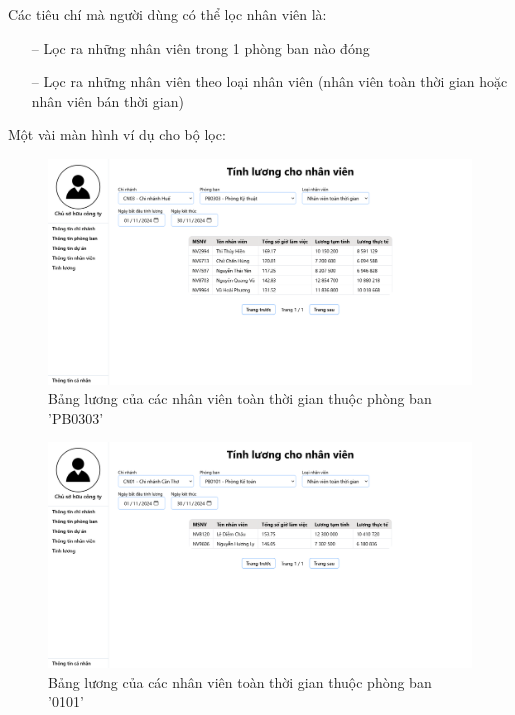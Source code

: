 Các tiêu chí mà người dùng có thể lọc nhân viên là:
\begin{itemize}
    \item [--] Lọc ra những nhân viên trong 1 phòng ban nào đóng
    \item [--] Lọc ra những nhân viên theo loại nhân viên (nhân viên toàn thời gian hoặc nhân viên bán thời gian)
\end{itemize}

Một vài màn hình ví dụ cho bộ lọc:
\begin{figure}[H]
    \centering
    \includegraphics[width=1\linewidth]{content/images/ManHinh_3_c.png}
    \caption{Bảng lương của các nhân viên toàn thời gian thuộc phòng ban 'PB0303'}
    \label{fig:ManHinh_3_c}
\end{figure}

\begin{figure}[H]
    \centering
    \includegraphics[width=1\linewidth]{content/images/ManHinh_3_d.png}
    \caption{Bảng lương của các nhân viên toàn thời gian thuộc phòng ban '0101'}
    \label{fig:ManHinh_3_d}
\end{figure}

